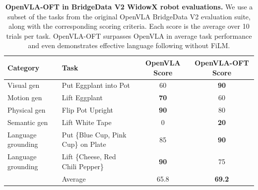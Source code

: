 \documentclass[conference]{IEEEtran}
\begin{document}
\begin{table}[h]
\centering
\caption{\textbf{OpenVLA-OFT in BridgeData V2 WidowX robot evaluations.} We use a subset of the tasks from the original OpenVLA BridgeData V2 evaluation suite, along with the corresponding scoring criteria. Each score is the average over 10 trials per task. OpenVLA-OFT surpasses OpenVLA in average task performance and even demonstrates effective language following without FiLM.}
\label{tab:bridge_results}
\begin{tabular}{llcc}
\toprule
Category & Task & OpenVLA Score & OpenVLA-OFT Score \\
\midrule
Visual gen & Put Eggplant into Pot & 60 & \textbf{90} \\
Motion gen & Lift Eggplant & \textbf{70} & 60 \\
Physical gen & Flip Pot Upright & \textbf{90} & 80 \\
Semantic gen & Lift White Tape & 0 & \textbf{20} \\
Language grounding & Put \{Blue Cup, Pink Cup\} on Plate & 85 & \textbf{90} \\
Language grounding & Lift \{Cheese, Red Chili Pepper\} & \textbf{90} & 75 \\
\midrule
& Average & 65.8 & \textbf{69.2} \\
\bottomrule
\end{tabular}
\end{table}
\end{document}
